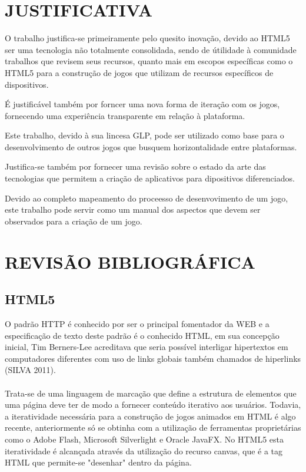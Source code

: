 \documentclass{article}
\begin{document}
\section{JUSTIFICATIVA}

O trabalho justifica-se primeiramente pelo quesito inovação, devido ao HTML5 ser uma tecnologia não totalmente consolidada, sendo de útilidade à comunidade trabalhos que revisem seus recursos, quanto mais em escopos específicas como o HTML5 para a construção de jogos que utilizam de recursos específicos de dispositivos.

É justificável também por forncer uma nova forma de iteração com os jogos, fornecendo uma experiência transparente em relação à plataforma.

Este trabalho, devido à sua lincesa GLP, pode ser utilizado como base para o desenvolvimento de outros jogos que busquem horizontalidade entre plataformas.

Justifica-se também por fornecer uma revisão sobre o estado da arte das tecnologias que permitem a criação de aplicativos para dipositivos diferenciados.

Devido ao completo mapeamento do proceesso de desenvovimento de um jogo, este trabalho pode servir como um manual dos aspectos que devem ser observados para a criação de um jogo.

\section{REVISÃO BIBLIOGRÁFICA}
\subsection{HTML5}

O padrão HTTP é conhecido por ser o principal fomentador da WEB e a especificação de texto deste padrão é o conhecido HTML, em sua concepção inicial, Tim Berners-Lee acreditava que seria possível  interligar hipertextos em computadores diferentes com uso de links globais também chamados de hiperlinks (SILVA 2011).
\\
\\ Trata-se de uma linguagem de marcação que define a estrutura de elementos que uma página deve ter de modo a fornecer conteúdo iterativo aos usuários. Todavia, a iteratividade necessária para a construção de jogos animados em HTML é algo recente, anteriormente só se obtinha com a utilização de ferramentas proprietárias como o Adobe Flash, Microsoft Silverlight e Oracle JavaFX.  No HTML5 esta iteratividade é alcançada através da utilização do recurso canvas, que é a tag HTML que permite-se "desenhar"  dentro da página. 
\end{document}
